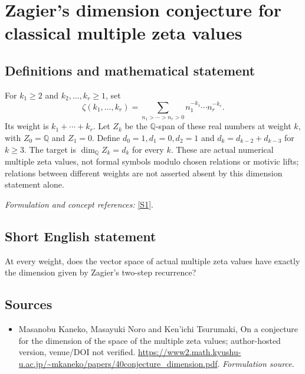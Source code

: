 \documentclass[11pt]{article}
\begin{document}
\section*{\texorpdfstring{Zagier's dimension conjecture for classical multiple zeta values}{Zagier's dimension conjecture for classical multiple zeta values}}\label{statement}
\subsection{Definitions and mathematical statement}
For $k_1\ge2$ and $k_2,\ldots,k_r\ge1$, set
\[
 \zeta(k_1,\ldots,k_r)=\sum_{n_1>\cdots>n_r>0}
 n_1^{-k_1}\cdots n_r^{-k_r}.
\]
Its weight is $k_1+\cdots+k_r$. Let $Z_k$ be the ${\mathbb{Q}}$-span of these real numbers at weight $k$, with $Z_0={\mathbb{Q}}$ and $Z_1=0$. Define $d_0=1,d_1=0,d_2=1$ and
$d_k=d_{k-2}+d_{k-3}$ for $k\ge3$. The target is $\dim_{{\mathbb{Q}}}Z_k=d_k$ for every $k$. These are actual numerical multiple zeta values, not formal symbols modulo chosen relations or motivic lifts; relations between different weights are not asserted absent by this dimension statement alone.
\par\smallskip\textit{Formulation and concept references:} \href{https://www2.math.kyushu-u.ac.jp/~mkaneko/papers/40conjecture_dimension.pdf}{[S1]}.

\subsection{Short English statement}
At every weight, does the vector space of actual multiple zeta values have exactly the dimension given by Zagier's two-step recurrence?
\subsection{Sources}
\begin{itemize}
\item[S1]Masanobu Kaneko, Masayuki Noro and Ken'ichi Tsurumaki, On a conjecture for the dimension of the space of the multiple zeta values; author-hosted version, venue/DOI not verified.
\url{https://www2.math.kyushu-u.ac.jp/~mkaneko/papers/40conjecture_dimension.pdf}.
\textit{Formulation source.}
\end{itemize}
\end{document}
